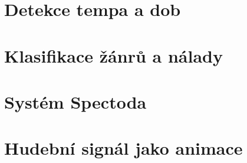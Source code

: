 
\section{Detekce tempa a dob}
\section{Klasifikace žánrů a nálady}

\section{Systém Spectoda}

\section{Hudební signál jako animace}